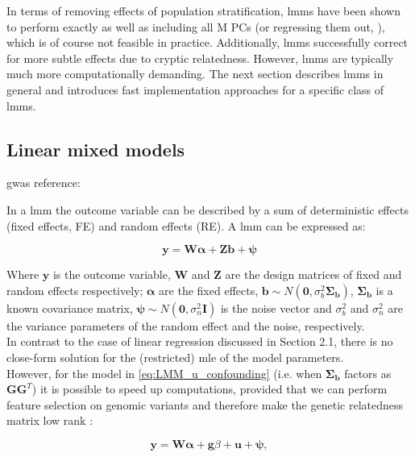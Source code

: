 In terms of removing effects of population stratification, \gls{lmm}s have been shown to perform exactly as well as  including all M PCs (or regressing them out, \cite{price2006principal}), which is of course not feasible in practice.
Additionally, \gls{lmm}s successfully correct for more subtle effects due to cryptic relatedness.
However, \gls{lmm}s are typically much more computationally demanding.
The next section describes \gls{lmm}s in general and introduces fast implementation approaches for a specific class of \gls{lmm}s.

\subsection{Linear mixed models}

gwas reference: \cite{bush2012genome}

In a \gls{lmm} the outcome variable can be described by a sum of deterministic effects (fixed effects, FE) and random effects (RE).
A \gls{lmm} can be expressed as:

\begin{equation}\label{eq:Linear_mixed_model_general}
 \mathbf{y} =  \mathbf{W}\boldsymbol{\alpha} + \mathbf{Z}\mathbf{b} + \boldsymbol{\psi} 
\end{equation}

Where $\mathbf{y}$ is the outcome variable, $\mathbf{W}$ and $\mathbf{Z}$ are the design matrices of fixed and random effects respectively; $\boldsymbol{\alpha}$ are the fixed effects, $\mathbf{b} \sim N(\mathbf{0},\sigma_b^2\boldsymbol{\Sigma_b})$, $\boldsymbol{\Sigma_b}$ is a known covariance matrix, $\boldsymbol{\psi} \sim N(\mathbf{0},\sigma_n^2\mathbf{I})$ is the noise vector and $\sigma_b^2$ and $\sigma_n^2$ are the variance parameters of the random effect and the noise, respectively.\\

In contrast to the case of linear regression discussed in Section 2.1, there is no close-form solution for the (restricted) \gls{mle} of the model parameters. \\

However, for the model in \eqref{eq:LMM_u_confounding} (i.e. when $\boldsymbol{\Sigma_b}$ factors as $\mathbf{G}\mathbf{G}^T$) it is possible to speed up computations, provided that we can perform feature selection on genomic variants and therefore make the genetic relatedness matrix low rank \cite{lippert2014greater}: 

\begin{equation}\label{eq:Linear_mixed_model}
 \mathbf{y} =  \mathbf{W}\boldsymbol{\alpha} + \mathbf{g}\beta + \mathbf{u} + \boldsymbol{\psi}, 
\end{equation}


